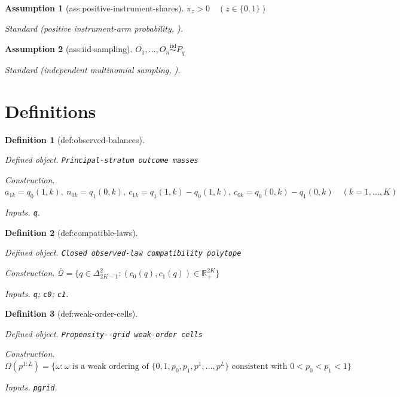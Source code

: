 \documentclass{article}
\newtheorem{assumption}{Assumption}
\newtheorem{definition}{Definition}
\begin{document}
\begin{assumption}[ass:positive-instrument-shares]\label{ass:positive-instrument-shares}
\(\pi_z>0\quad(z\in\{0,1\})\)
\par\smallskip\noindent\emph{Standard} (positive instrument-arm probability, \cite{Marx2024SharpBounds}).
\end{assumption}

\begin{assumption}[ass:iid-sampling]\label{ass:iid-sampling}
\(O_1,\ldots,O_n\overset{\mathrm{iid}}{\sim}P_q\)
\par\smallskip\noindent\emph{Standard} (independent multinomial sampling, \cite{SongGuoChanRichardson2024CategoricalIV}).
\end{assumption}

\section{Definitions}

\begin{definition}[def:observed-balances]\label{def:observed-balances}
\par\smallskip\noindent\emph{Defined object.} \texttt{Principal-\allowbreak{}stratum outcome masses}
\par\smallskip\noindent\emph{Construction.} \(a_{1k}=q_0(1,k),\ n_{0k}=q_1(0,k),\ c_{1k}=q_1(1,k)-q_0(1,k),\ c_{0k}=q_0(0,k)-q_1(0,k)\quad(k=1,\ldots,K)\)
\par\smallskip\noindent\emph{Inputs.} \texttt{q}.
\end{definition}

\begin{definition}[def:compatible-laws]\label{def:compatible-laws}
\par\smallskip\noindent\emph{Defined object.} \texttt{Closed observed-\allowbreak{}law compatibility polytope}
\par\smallskip\noindent\emph{Construction.} \(\overline{\mathcal Q}=\{q\in\Delta_{2K-1}^2:(c_0(q),c_1(q))\in\mathbb R_+^{2K}\}\)
\par\smallskip\noindent\emph{Inputs.} \texttt{q}; \texttt{c0}; \texttt{c1}.
\end{definition}

\begin{definition}[def:weak-order-cells]\label{def:weak-order-cells}
\par\smallskip\noindent\emph{Defined object.} \texttt{Propensity-\allowbreak{}-\allowbreak{}grid weak-\allowbreak{}order cells}
\par\smallskip\noindent\emph{Construction.} \(\Omega(p^{1:L})=\{\omega:\omega\text{ is a weak ordering of }\{0,1,p_0,p_1,p^1,\ldots,p^L\}\text{ consistent with }0<p_0<p_1<1\}\)
\par\smallskip\noindent\emph{Inputs.} \texttt{pgrid}.
\end{definition}
\end{document}
